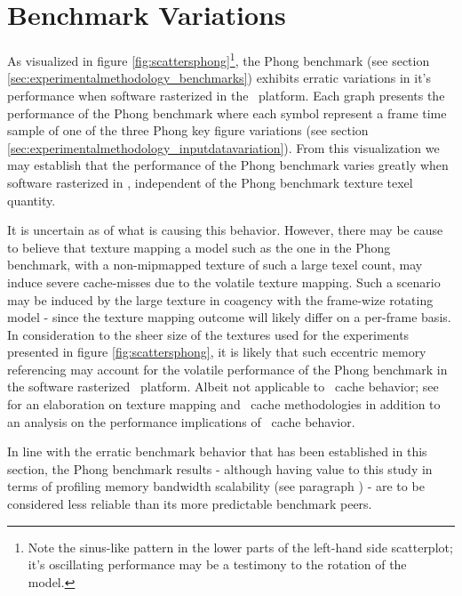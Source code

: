 

\section{Benchmark Variations}
\label{sec:results_benchmarkvariations}
As visualized in figure \ref{fig:scattersphong}\footnote{Note the sinus-like pattern in the lower parts of the left-hand side scatterplot; it's oscillating performance may be a testimony to the rotation of the model.}, the Phong benchmark (see section \ref{sec:experimentalmethodology_benchmarks}) exhibits erratic variations in it's performance when software rasterized in the \dvttermsimics\ platform.
Each graph presents the performance of the Phong benchmark where each symbol represent a frame time sample of one of the three Phong key figure variations (see section \ref{sec:experimentalmethodology_inputdatavariation}).
From this visualization we may establish that the performance of the Phong benchmark varies greatly when software rasterized in \dvttermsimics , independent of the Phong benchmark texture texel quantity.

It is uncertain as of what is causing this behavior.
However, there may be cause to believe that texture mapping a model such as the one in the Phong benchmark, with a non-mipmapped texture of such a large texel count, may induce severe cache-misses due to the volatile texture mapping.
Such a scenario may be induced by the large texture in coagency with the frame-wize rotating model - since the texture mapping outcome will likely differ on a per-frame basis.
In consideration to the sheer size of the textures used for the experiments presented in figure \ref{fig:scattersphong}, it is likely that such eccentric memory referencing may account for the volatile performance of the Phong benchmark in the software rasterized \dvttermsimics\ platform.
Albeit not applicable to \dvttermcpu\ cache behavior; see ~ for an elaboration on texture mapping and \dvttermgpu\ cache methodologies in addition to an analysis on the performance implications of \dvttermgpu\ cache behavior.

In line with the erratic benchmark behavior that has been established in this section, the Phong benchmark results - although having value to this study in terms of profiling memory bandwidth scalability (see paragraph ) - are to be considered less reliable than its more predictable benchmark peers.


